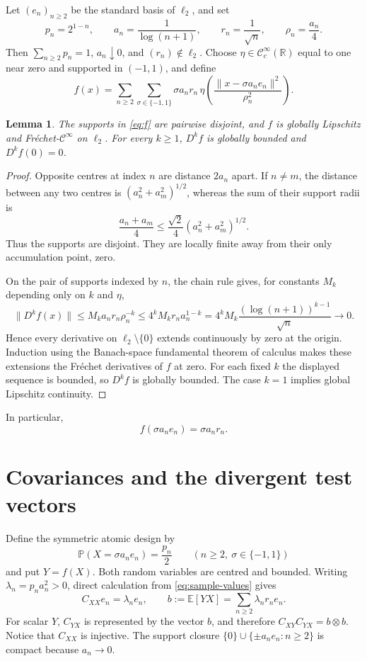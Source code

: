 \documentclass[10pt]{article}
\newtheorem{lemma}{Lemma}
\newcommand{\R}{\mathbb R}
\newcommand{\E}{\mathbb E}
\newcommand{\cC}{\mathcal C}
\begin{document}
Let $(e_n)_{n\geq2}$ be the standard basis of $\ell_2$, and set
\[
 p_n=2^{1-n},\qquad a_n=\frac1{\log(n+1)},\qquad
 r_n=\frac1{\sqrt n},\qquad \rho_n=\frac{a_n}{4}.
\]
Then $\sum_{n\geq2}p_n=1$, $a_n\downarrow0$, and $(r_n)\notin\ell_2$.
Choose $\eta\in\cC_c^\infty(\R)$ equal to one near zero and supported in
$(-1,1)$, and define
\begin{equation}\label{eq:f}
 f(x)=\sum_{n\geq2}\sum_{\sigma\in\{-1,1\}}
 \sigma a_nr_n\,
 \eta\!\left(\frac{\|x-\sigma a_ne_n\|^2}{\rho_n^2}\right).
\end{equation}

\begin{lemma}\label{lem:smooth}
The supports in \eqref{eq:f} are pairwise disjoint, and $f$ is globally
Lipschitz and Fr\'echet-$\cC^\infty$ on $\ell_2$. For every $k\geq1$,
$D^kf$ is globally bounded and $D^kf(0)=0$.
\end{lemma}

\begin{proof}
Opposite centres at index $n$ are distance $2a_n$ apart. If $n\ne m$, the
distance between any two centres is $(a_n^2+a_m^2)^{1/2}$, whereas the sum
of their support radii is
\[
 \frac{a_n+a_m}{4}\leq\frac{\sqrt2}{4}(a_n^2+a_m^2)^{1/2}.
\]
Thus the supports are disjoint. They are locally finite away from their only
accumulation point, zero.

On the pair of supports indexed by $n$, the chain rule gives, for constants
$M_k$ depending only on $k$ and $\eta$,
\[
 \|D^kf(x)\|\leq M_k a_nr_n\rho_n^{-k}
 \leq 4^kM_k r_na_n^{1-k}
 =4^kM_k\frac{(\log(n+1))^{k-1}}{\sqrt n}\longrightarrow0.
\]
Hence every derivative on $\ell_2\setminus\{0\}$ extends continuously by
zero at the origin. Induction using the Banach-space fundamental theorem of
calculus makes these extensions the Fr\'echet derivatives of $f$ at zero.
For each fixed $k$ the displayed sequence is bounded, so $D^kf$ is globally
bounded. The case $k=1$ implies global Lipschitz continuity.
\end{proof}

In particular,
\begin{equation}\label{eq:sample-values}
 f(\sigma a_ne_n)=\sigma a_nr_n.
\end{equation}

\section{Covariances and the divergent test vectors}

Define the symmetric atomic design by
\[
 \mathbb P(X=\sigma a_ne_n)=\frac{p_n}{2}
 \qquad(n\geq2,\ \sigma\in\{-1,1\})
\]
and put $Y=f(X)$. Both random variables are centred and bounded. Writing
$\lambda_n=p_na_n^2>0$, direct calculation from
\eqref{eq:sample-values} gives
\begin{equation}\label{eq:covariances}
 C_{XX}e_n=\lambda_ne_n,
 \qquad
 b:=\E[YX]=\sum_{n\geq2}\lambda_nr_ne_n.
\end{equation}
For scalar $Y$, $C_{YX}$ is represented by the vector $b$, and therefore
$C_{XY}C_{YX}=b\otimes b$. Notice that $C_{XX}$ is injective.
The support closure $\{0\}\cup\{\pm a_ne_n:n\geq2\}$ is compact because
$a_n\to0$.
\end{document}
